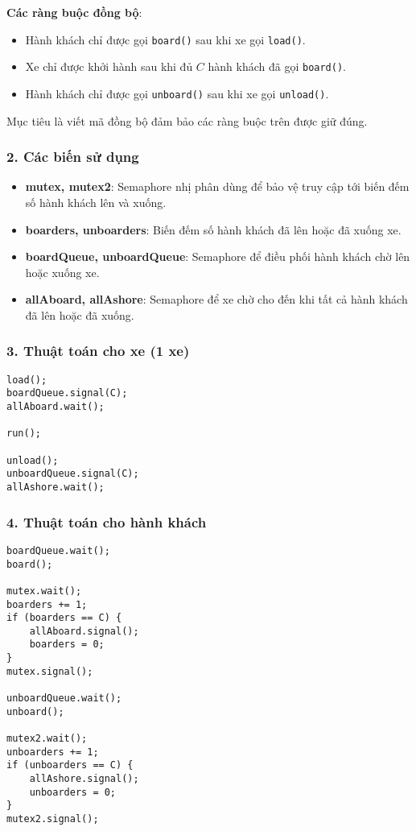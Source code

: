 \textbf{Các ràng buộc đồng bộ}:
\begin{itemize}
    \item Hành khách chỉ được gọi \texttt{board()} sau khi xe gọi \texttt{load()}.
    \item Xe chỉ được khởi hành sau khi đủ $C$ hành khách đã gọi \texttt{board()}.
    \item Hành khách chỉ được gọi \texttt{unboard()} sau khi xe gọi \texttt{unload()}.
\end{itemize}

Mục tiêu là viết mã đồng bộ đảm bảo các ràng buộc trên được giữ đúng.

\subsubsection*{2. Các biến sử dụng}

\begin{itemize}
    \item \textbf{mutex, mutex2}: Semaphore nhị phân dùng để bảo vệ truy cập tới biến đếm số hành khách lên và xuống.
    \item \textbf{boarders, unboarders}: Biến đếm số hành khách đã lên hoặc đã xuống xe.
    \item \textbf{boardQueue, unboardQueue}: Semaphore để điều phối hành khách chờ lên hoặc xuống xe.
    \item \textbf{allAboard, allAshore}: Semaphore để xe chờ cho đến khi tất cả hành khách đã lên hoặc đã xuống.
\end{itemize}

\subsubsection*{3. Thuật toán cho xe (1 xe)}

\begin{lstlisting}
load();
boardQueue.signal(C);
allAboard.wait();

run();

unload();
unboardQueue.signal(C);
allAshore.wait();
\end{lstlisting}

\subsubsection*{4. Thuật toán cho hành khách}

\begin{lstlisting}
boardQueue.wait();
board();

mutex.wait();
boarders += 1;
if (boarders == C) {
    allAboard.signal();
    boarders = 0;
}
mutex.signal();

unboardQueue.wait();
unboard();

mutex2.wait();
unboarders += 1;
if (unboarders == C) {
    allAshore.signal();
    unboarders = 0;
}
mutex2.signal();
\end{lstlisting}

